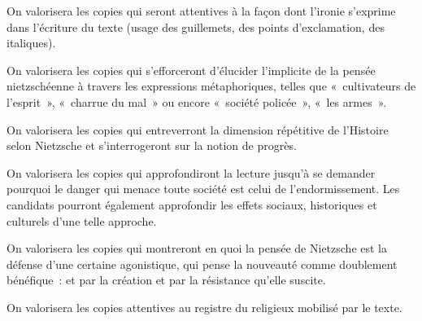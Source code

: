 {On valorisera les copies qui seront attentives à la façon dont l'ironie s'exprime dans
l'écriture du texte (usage des guillemets, des points d'exclamation, des italiques).

On valorisera les copies qui s'efforceront d'élucider l'implicite de la pensée
nietzschéenne à travers les expressions métaphoriques, telles que «~cultivateurs de
l'esprit~», «~charrue du mal~» ou encore «~société policée~», «~les armes~».

On valorisera les copies qui entreverront la dimension répétitive de l'Histoire selon
Nietzsche et s'interrogeront sur la notion de progrès.

On valorisera les copies qui approfondiront la lecture jusqu'à se demander pourquoi le
danger qui menace toute société est celui de l'endormissement. Les candidats
pourront également approfondir les effets sociaux, historiques et culturels d'une telle
approche.

On valorisera les copies qui montreront en quoi la pensée de Nietzsche est la défense
d'une certaine agonistique, qui pense la nouveauté comme doublement bénéfique~: et
par la création et par la résistance qu'elle suscite.

On valorisera les copies attentives au registre du religieux mobilisé par le texte.}%
